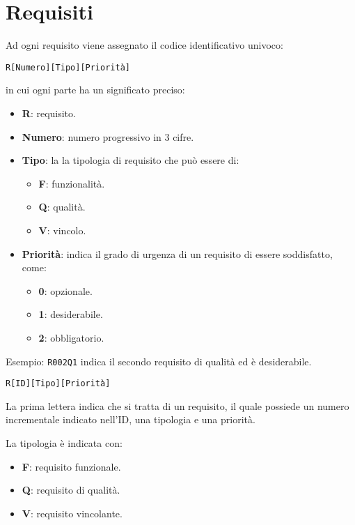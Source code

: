 \section{Requisiti}
Ad ogni requisito viene assegnato il codice identificativo univoco:
	\begin{center}
		\texttt{R[Numero][Tipo][Priorità]} 
	\end{center} 
	in cui ogni parte ha un significato preciso:
	\begin{itemize}
		\item \textbf{R}: requisito.
		\item \textbf{Numero}: numero progressivo in 3 cifre.
		\item \textbf{Tipo}: la la tipologia di requisito che può essere di:
		\begin{itemize}
			\item \textbf{F}: funzionalità.
			\item \textbf{Q}: qualità.
			\item \textbf{V}: vincolo.
		\end{itemize}
		\item \textbf{Priorità}: indica il grado di urgenza di un requisito di essere soddisfatto, come:
		\begin{itemize}
			\item \textbf{0}: opzionale.
			\item \textbf{1}: desiderabile.
			\item \textbf{2}: obbligatorio.
		\end{itemize}
	\end{itemize}
	
	Esempio: \texttt{R002Q1} indica il secondo requisito di qualità ed è desiderabile.
	
	

\begin{center}
	\texttt{R[ID][Tipo][Priorità]}
\end{center}

La prima lettera indica che si tratta di un requisito, il quale possiede un numero incrementale indicato nell'ID, una tipologia e una priorità.

La tipologia è indicata con:

\begin{itemize}
	\item \textbf{F}: requisito funzionale.
	\item \textbf{Q}: requisito di qualità.
	\item \textbf{V}: requisito vincolante.
\end{itemize}

